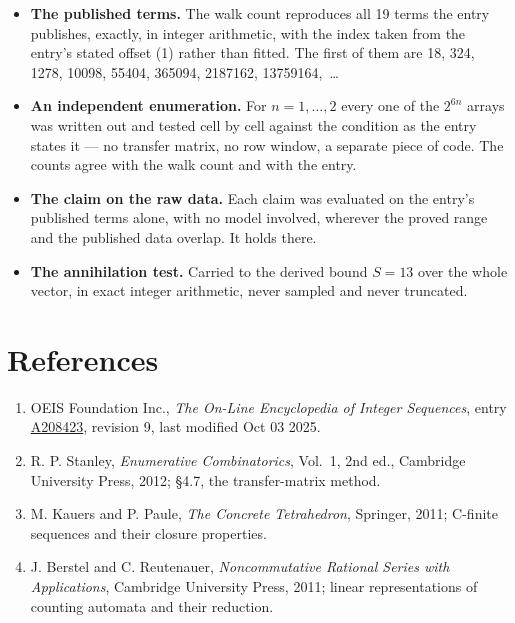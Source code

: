 \documentclass[11pt]{article}
\theoremstyle{definition}
\begin{document}
\begin{itemize}

\item {\bfseries The published terms.} The walk count reproduces all 19 terms the entry publishes, exactly, in integer arithmetic, with the index taken from the entry's stated offset (1) rather than fitted. The first of them are 18, 324, 1278, 10098, 55404, 365094, 2187162, 13759164,~\dots

\item {\bfseries An independent enumeration.} For $n = 1,\dots,2$ every one of the $2^{6n}$ arrays was written out and tested cell by cell against the condition as the entry states it --- no transfer matrix, no row window, a separate piece of code. The counts agree with the walk count and with the entry.

\item {\bfseries The claim on the raw data.} Each claim was evaluated on the entry's published terms alone, with no model involved, wherever the proved range and the published data overlap. It holds there.

\item {\bfseries The annihilation test.} Carried to the derived bound $S = 13$ over the whole vector, in exact integer arithmetic, never sampled and never truncated.

\end{itemize}

\section{References}

\begin{enumerate}

\item OEIS Foundation Inc., \emph{The On-Line Encyclopedia of Integer Sequences}, entry \href{https://oeis.org/A208423}{A208423}, revision 9, last modified Oct 03 2025.

\item R. P. Stanley, \emph{Enumerative Combinatorics}, Vol.~1, 2nd ed., Cambridge University Press, 2012; \S4.7, the transfer-matrix method.

\item M. Kauers and P. Paule, \emph{The Concrete Tetrahedron}, Springer, 2011; C-finite sequences and their closure properties.

\item J. Berstel and C. Reutenauer, \emph{Noncommutative Rational Series with Applications}, Cambridge University Press, 2011; linear representations of counting automata and their reduction.

\end{enumerate}
\end{document}
